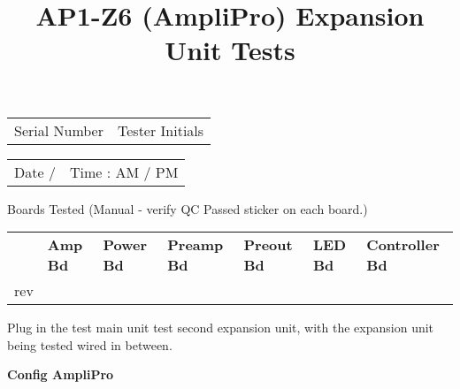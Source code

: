 \documentclass{article}
\title{AP1-Z6 (AmpliPro) Expansion Unit Tests}
\author{} %
\begin{document}
\maketitle            %
\thispagestyle{fancy} %

\begin{tabularx}{\textwidth}{XX}
  Serial Number \hrulefill & Tester Initials \hrulefill
\end{tabularx}

\bigskip
\begin{tabularx}{\textwidth}{XX}
  Date \hrulefill\hspace{0.2em} / \hrulefill &
    Time \hrulefill\hspace{0.2em} : \hrulefill\hspace{0.2em} AM / PM
\end{tabularx}

\bigskip
\begin{checklist}
  \item Boards Tested (Manual - verify QC Passed sticker on each board.)
\end{checklist}

{\renewcommand{\arraystretch}{1.5} %
\begin{tabularx}{\textwidth}{lXXXXXX}
  & \textbf{Amp Bd} & \textbf{Power Bd} & \textbf{Preamp Bd} &
    \textbf{Preout Bd} & \textbf{LED Bd} & \textbf{Controller Bd} \\
  \cline{2-7}
  rev & \multicolumn{1}{|c|}{} & \multicolumn{1}{|c|}{} & \multicolumn{1}{|c|}{}
    & \multicolumn{1}{|c|}{} & \multicolumn{1}{|c|}{} & \multicolumn{1}{|c|}{} \\
  \cline{2-7}
\end{tabularx}}

\bigskip
Plug in the test main unit test second expansion unit,
with the expansion unit being tested wired in between.

\begin{checklist}
  \item \textbf{Config AmpliPro}
\end{checklist}
\end{document}
